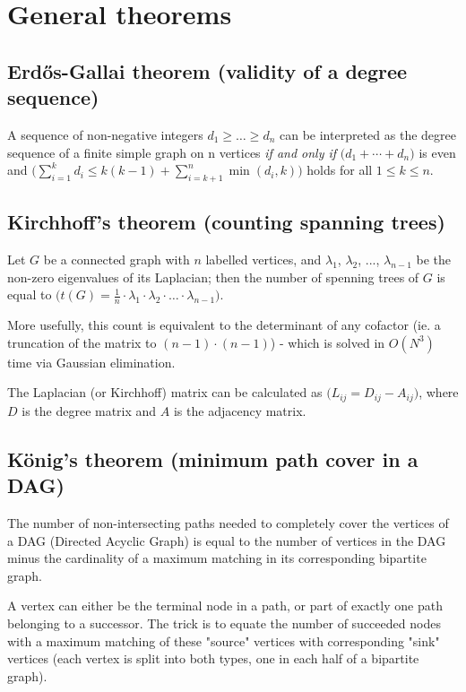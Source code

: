 \section {General theorems}

  \subsection {Erd\H{o}s-Gallai theorem (validity of a degree sequence)}
    A sequence of non-negative integers $ d_1 \geq \ldots \geq d_n $ can be interpreted as the
    degree sequence of a finite simple graph on n vertices \emph{if and only if}
    $ \big( d_1+\cdots+d_n \big) $
    is even and
    $ \big( \sum^{k}_{i=1}d_i\leq k(k-1)+ \sum^n_{i=k+1} \min(d_i,k) \big) $
    holds for all
    $ 1\leq k\leq n $.

  \subsection {Kirchhoff's theorem (counting spanning trees)}
    Let $G$ be a connected graph with $n$ labelled vertices, and $\lambda_1$, $\lambda_2$, ..., $\lambda_{n−1}$ be the non-zero eigenvalues of its Laplacian;
    then the number of spenning trees of $G$ is equal to $ \big( t(G)=\frac{1}{n} \cdot \lambda_1 \cdot \lambda_2 \cdot \ldots \cdot \lambda_{n-1} \big) $.

    More usefully, this count is equivalent to the determinant of any cofactor (ie. a truncation of the matrix to $ (n-1) \cdot (n-1) $) - which is solved in
    $ O(N^3) $ time via Gaussian elimination.

    The Laplacian (or Kirchhoff) matrix can be calculated as $ \big( L_{ij} = D_{ij} - A_{ij} \big) $, where $D$ is the degree matrix and $A$ is the adjacency matrix.

  \subsection {K\"{o}nig's theorem (minimum path cover in a DAG)}
    The number of non-intersecting paths needed to completely cover the vertices of a DAG (Directed Acyclic Graph) is equal to the number of vertices in the DAG
    minus the cardinality of a maximum matching in its corresponding bipartite graph.

    A vertex can either be the terminal node in a path, or part of exactly one path belonging to a successor. The trick is to equate the number of succeeded nodes
    with a maximum matching of these "source" vertices with corresponding "sink" vertices (each vertex is split into both types, one in each half of a bipartite
    graph).

